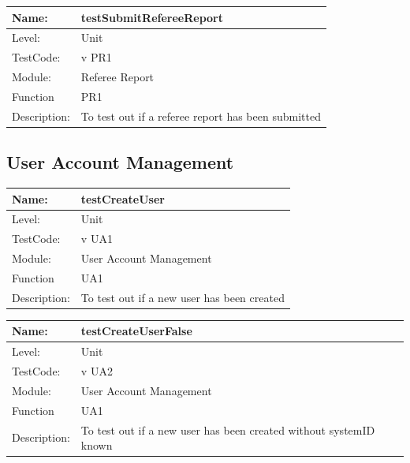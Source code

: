 \documentclass[12pt]{article}
\begin{document}
\begin{center}
\begin{tabular}{|l|p{12cm}|}
\hline

 Name: & testSubmitRefereeReport \\
\hline
Level: & Unit \\
\hline
TestCode: & v PR1 \\
\hline
Module:& Referee Report\\
\hline
Function & PR1 \\
\hline
Description: & To test out if a referee report has been submitted \\
\hline

\end{tabular}
\end{center}

\subsection{User Account Management}
\begin{center}
\begin{tabular}{|l|p{12cm}|}
\hline

 Name: & testCreateUser \\
\hline
Level: & Unit \\
\hline
TestCode: & v UA1 \\
\hline
Module:& User Account Management\\
\hline
Function & UA1 \\
\hline
Description: & To test out if a new user has been created \\
\hline

\end{tabular}
\end{center}


\begin{center}
\begin{tabular}{|l|p{12cm}|}
\hline

 Name: & testCreateUserFalse \\
\hline
Level: & Unit \\
\hline
TestCode: & v UA2 \\
\hline
Module:& User Account Management\\
\hline
Function & UA1 \\
\hline
Description: & To test out if a new user has been created without systemID known\\
\hline

\end{tabular}
\end{center}
\end{document}
